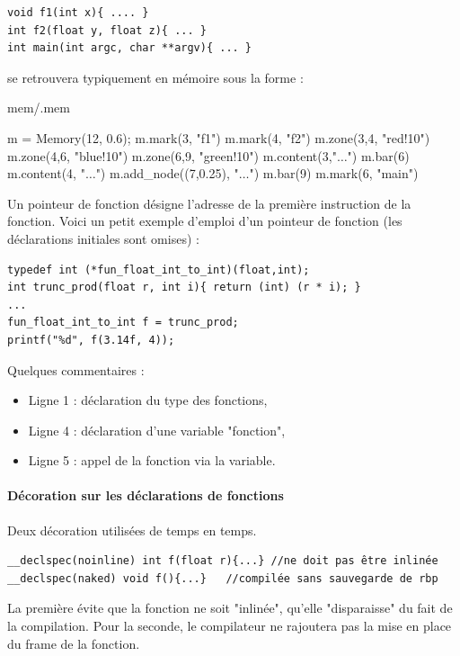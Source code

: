 \documentclass{book}
\newcounter{Qcours}
\newenvironment{memory}{%
	\noindent
	\VerbatimEnvironment\stepcounter{Qcours}%
	\begin{VerbatimOut}{mem/\theQcours.mem}%
	}{\end{VerbatimOut}%
}
\begin{document}
\begin{verbatim}
void f1(int x){ .... }
int f2(float y, float z){ ... }
int main(int argc, char **argv){ ... }
\end{verbatim}

\noindent se retrouvera typiquement en mémoire sous la forme : 

\medskip
\begin{memory}
m = Memory(12, 0.6);
m.mark(3, "f1")
m.mark(4, "f2")
m.zone(3,4, "red!10")
m.zone(4,6, "blue!10")
m.zone(6,9,  "green!10")
m.content(3,"$\ldots$")
m.bar(6)
m.content(4, "$\ldots$")
m.add_node((7,0.25), "$\ldots$")
m.bar(9)
m.mark(6, "main")
\end{memory}

Un pointeur de fonction désigne l'adresse de la première instruction de la fonction. Voici un petit exemple d'emploi d'un pointeur de fonction (les déclarations initiales sont omises) : 

\begin{verbatim}
typedef int (*fun_float_int_to_int)(float,int);
int trunc_prod(float r, int i){ return (int) (r * i); }
...
fun_float_int_to_int f = trunc_prod;
printf("%d", f(3.14f, 4));
\end{verbatim}

Quelques commentaires : 
\begin{itemize}
	\item Ligne 1 : déclaration du type des fonctions, 
	\item Ligne 4 : déclaration d'une variable "fonction",
	\item Ligne 5 : appel de la fonction via la variable. 
\end{itemize}

\paragraph{Décoration sur les déclarations de fonctions }

Deux décoration utilisées de temps en temps. 

\begin{verbatim}
__declspec(noinline) int f(float r){...} //ne doit pas être inlinée
__declspec(naked) void f(){...}   //compilée sans sauvegarde de rbp
\end{verbatim}

La première évite que la fonction ne soit "inlinée", qu'elle "disparaisse" du fait de la compilation. Pour la seconde, le compilateur ne rajoutera pas la mise en place du frame de la fonction. 
\end{document}
